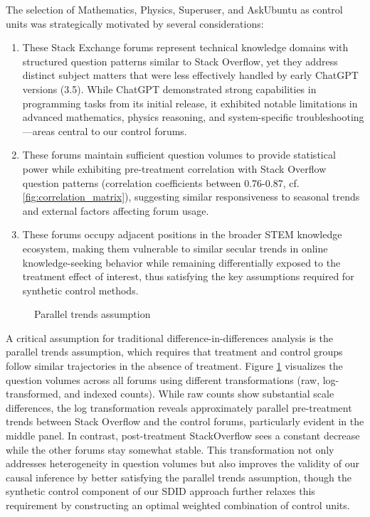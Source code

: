 The selection of Mathematics, Physics, Superuser, and AskUbuntu as control units was strategically motivated by several considerations:
\begin{enumerate}
    \item These Stack Exchange forums represent technical knowledge domains with structured question patterns similar to Stack Overflow, yet they address distinct subject matters that were less effectively handled by early ChatGPT versions (3.5). While ChatGPT demonstrated strong capabilities in programming tasks from its initial release, it exhibited notable limitations in advanced mathematics, physics reasoning, and system-specific troubleshooting—areas central to our control forums. 
    \item These forums maintain sufficient question volumes to provide statistical power while exhibiting pre-treatment correlation with Stack Overflow question patterns (correlation coefficients between 0.76-0.87, cf. \ref{fig:correlation_matrix}), suggesting similar responsiveness to seasonal trends and external factors affecting forum usage. 
    \item These forums occupy adjacent positions in the broader STEM knowledge ecosystem, making them vulnerable to similar secular trends in online knowledge-seeking behavior while remaining differentially exposed to the treatment effect of interest, thus satisfying the key assumptions required for synthetic control methods.
\end{enumerate}

\begin{figure}[htpb!]
    \centering
    
    \caption{Parallel trends assumption}
    \label{fig:transformed_trends}
\end{figure}

A critical assumption for traditional difference-in-differences analysis is the parallel trends assumption, which requires that treatment and control groups follow similar trajectories in the absence of treatment. Figure \ref{fig:transformed_trends} visualizes the question volumes across all forums using different transformations (raw, log-transformed, and indexed counts). While raw counts show substantial scale differences, the log transformation reveals approximately parallel pre-treatment trends between Stack Overflow and the control forums, particularly evident in the middle panel. In contrast, post-treatment StackOverflow sees a constant decrease while the other forums stay somewhat stable. This transformation not only addresses heterogeneity in question volumes but also improves the validity of our causal inference by better satisfying the parallel trends assumption, though the synthetic control component of our SDID approach further relaxes this requirement by constructing an optimal weighted combination of control units.\\

